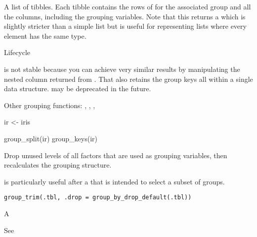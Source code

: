 \documentclass[a4paper]{book}
\begin{document}
%
\begin{Value}
A list of tibbles. Each tibble contains the rows of  for the
associated group and all the columns, including the grouping variables.
Note that this returns a  which is slightly
stricter than a simple list but is useful for representing lists where
every element has the same type.
\end{Value}
%
\begin{Section}{Lifecycle}

 is not stable because you can achieve very similar results by
manipulating the nested column returned from
. That also retains the group keys all
within a single data structure.  may be deprecated in the
future.
\end{Section}
%
\begin{SeeAlso}
Other grouping functions: 
,
,
,
\end{SeeAlso}
%
\begin{Examples}
\begin{ExampleCode}
ir <- iris %

group_split(ir)
group_keys(ir)
\end{ExampleCode}
\end{Examples}
%
\begin{Description}
\strong{[Experimental]}
Drop unused levels of all factors that are used as grouping variables,
then recalculates the grouping structure.

 is particularly useful after a  that is intended
to select a subset of groups.
\end{Description}
%
\begin{Usage}
\begin{verbatim}
group_trim(.tbl, .drop = group_by_drop_default(.tbl))
\end{verbatim}
\end{Usage}
%
\begin{Arguments}
\begin{ldescription}
\item[\code{.tbl}] A 

\item[\code{.drop}] See 
\end{ldescription}
\end{Arguments}
\end{document}
